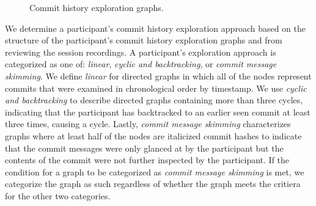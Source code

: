 \begin{figure}[h]
  \centering%
  \qquad
  \caption{
    Commit history exploration graphs.
  }%
  \label{fig:Exploration-Graphs}%
\end{figure}

We determine a participant's commit history exploration approach based on the structure 
of the participant's commit history exploration graphs and from reviewing the session recordings.
A participant's exploration approach is categorized as one of:
\textit{linear}, \textit{cyclic and backtracking}, or \textit{commit message skimming}.
We define \textit{linear} for directed graphs in which all of the nodes represent commits 
that were examined in chronological order by timestamp. 
We use \textit{cyclic and backtracking} to describe directed graphs 
containing more than three cycles, indicating that the participant has backtracked to
an earlier seen commit at least three times, causing a cycle. 
Lastly, \textit{commit message skimming} characterizes graphs where 
at least half of the nodes are italicized commit hashes to indicate
that the commit messages were only glanced at by the participant but the
contents of the commit were not further inspected by the participant.
If the condition for a graph to be categorized as \textit{commit message skimming} is met,
we categorize the graph as such regardless of whether the graph meets the critiera for the other two categories.

